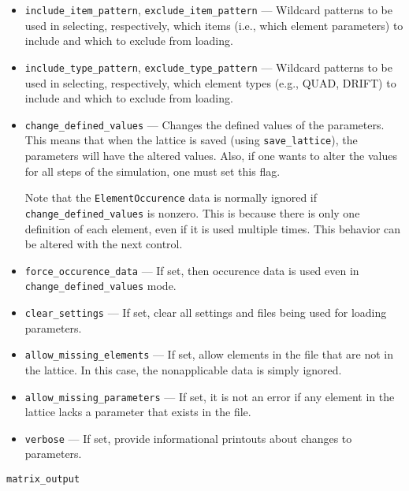 \documentclass[11pt]{article}
\begin{document}
\begin{itemize}
\item \verb|include_item_pattern|, \verb|exclude_item_pattern| ---
Wildcard patterns to be used in selecting, respectively, which items
(i.e., which element parameters) to include and which to exclude from
loading.

\item \verb|include_type_pattern|, \verb|exclude_type_pattern| ---
Wildcard patterns to be used in selecting, respectively, which element
types (e.g., QUAD, DRIFT) to include and which to exclude from
loading.

\item \verb|change_defined_values| --- Changes the defined values of
the parameters.  This means that when the lattice is saved (using
\verb|save_lattice|), the parameters will have the altered values.
Also, if one wants to alter the values for all steps of the simulation,
one must set this flag. 

Note that the \verb|ElementOccurence| data is normally ignored if
\verb|change_defined_values| is nonzero.  This is because there is
only one definition of each element, even if it is used multiple times.
This behavior can be altered with the next control.

\item \verb|force_occurence_data| --- If set, then occurence data is
used even in \verb|change_defined_values| mode.

\item \verb|clear_settings| --- If set, clear all settings and files
being used for loading parameters.

\item \verb|allow_missing_elements| --- If set, allow elements in the
file that are not in the lattice.  In this case, the nonapplicable
data is simply ignored.

\item \verb|allow_missing_parameters| --- If set, it is not an error
if any element in the lattice lacks a parameter that exists in the file.

\item \verb|verbose| --- If set, provide informational printouts about
changes to parameters.

\end{itemize}

\begin{latexonly}
\newpage
\begin{center}{\Large\verb|matrix_output|}\end{center}
\end{latexonly}
\end{document}
